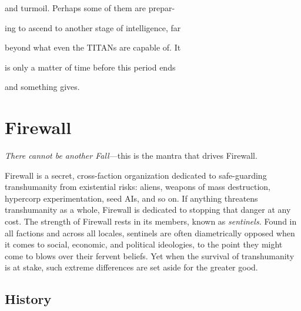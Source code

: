 and turmoil. Perhaps some of them are prepar-

ing to ascend to another stage of intelligence, far 

beyond what even the TITANs are capable of. It 

is only a matter of time before this period ends 

and something gives.

\section{Firewall}

\textit{There cannot be another Fall}—this is the mantra that 
drives Firewall. 

Firewall is a secret, cross-faction organization dedicated
to safe-guarding transhumanity from existential
risks: aliens, weapons of mass destruction, hypercorp 
experimentation, seed AIs, and so on. If anything 
threatens transhumanity as a whole, Firewall is dedicated
to stopping that danger at any cost.
The strength of Firewall rests in its members, known 
as \textit{sentinels.} Found in all factions and across all locales, 
sentinels are often diametrically opposed when it comes 
to social, economic, and political ideologies, to the point 
they might come to blows over their fervent beliefs. Yet 
when the survival of transhumanity is at stake, such 
extreme differences are set aside for the greater good. 

\subsection{History}

